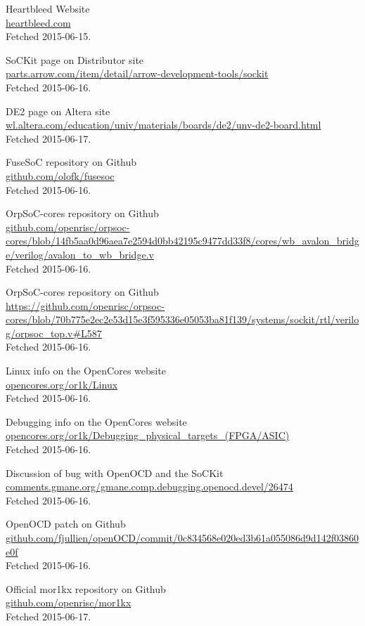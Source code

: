 \documentclass[11pt,a4paper,twoside,openany]{report}
\begin{document}
\begin{thebibliography}{99}

  Heartbleed Website\\
  \url{heartbleed.com}\\
  Fetched 2015-06-15.
  
  SoCKit page on Distributor site\\
  \url{parts.arrow.com/item/detail/arrow-development-tools/sockit}\\
  Fetched 2015-06-16.

	DE2 page on Altera site\\
  \url{wl.altera.com/education/univ/materials/boards/de2/unv-de2-board.html}\\
  Fetched 2015-06-17.
  
  FuseSoC repository on Github\\
  \url{github.com/olofk/fusesoc}\\
  Fetched 2015-06-16.
  
	OrpSoC-cores repository on Github\\
	\url{github.com/openrisc/orpsoc-cores/blob/14fb5aa0d96aea7e2594d0bb42195c9477dd33f8/cores/wb_avalon_bridge/verilog/avalon_to_wb_bridge.v} \\
	Fetched 2015-06-16.
	  
	OrpSoC-cores repository on Github\\
	\url{https://github.com/openrisc/orpsoc-cores/blob/70b775e2ec2e53d15e3f595336e05053ba81f139/systems/sockit/rtl/verilog/orpsoc_top.v#L587} \\
	Fetched 2015-06-16.
	
	Linux info on the OpenCores website\\
	\url{opencores.org/or1k/Linux}\\
	Fetched 2015-06-16.
	
	Debugging info on the OpenCores website\\
	\url{opencores.org/or1k/Debugging_physical_targets_(FPGA/ASIC)}\\
	Fetched 2015-06-16.
	
	Discussion of bug with OpenOCD and the SoCKit\\
	\url{comments.gmane.org/gmane.comp.debugging.openocd.devel/26474}\\
	Fetched 2015-06-16.
	
	OpenOCD patch on Github\\
	\url{github.com/fjullien/openOCD/commit/0c834568e020ed3b61a055086d9d142f03860e0f}\\
	Fetched 2015-06-16.
	
	Official mor1kx repository on Github\\
	\url{github.com/openrisc/mor1kx}\\
	Fetched 2015-06-17.

\end{thebibliography}
\end{document}
